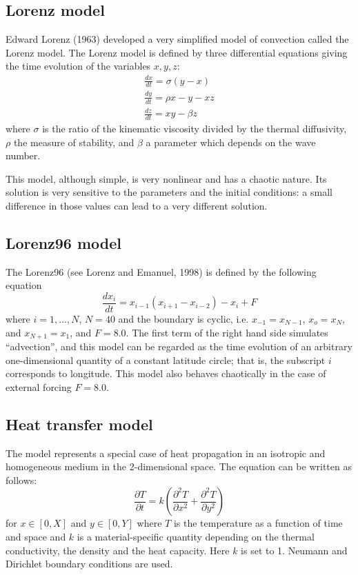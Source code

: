 \documentclass[a4paper,12pt]{article}
\begin{document}
     \subsection{Lorenz model}
     Edward Lorenz (1963) developed a very simplified model of convection called the Lorenz model. The Lorenz model is defined by three differential equations giving the time evolution of the variables $x,y,z$:
      \begin{eqnarray}
         \frac{dx}{dt}=\sigma(y-x) \\
         \frac{dy}{dt}=\rho x - y -x z \\
         \frac{dz}{dt}=x y - \beta z
      \end{eqnarray}
      where $\sigma$ is the ratio of the kinematic viscosity divided by the thermal diffusivity, $\rho$ the measure of stability, and $\beta$ a parameter which depends on the wave number.

      This model, although simple, is very nonlinear and has a chaotic nature.
      Its solution is very sensitive to the parameters and the initial
      conditions: a small difference in those values can lead to a very different solution.

      \subsection{Lorenz96 model} %
      The Lorenz96 (see Lorenz and Emanuel, 1998) is defined by the following equation
      \begin{equation}
         \frac{dx_i}{dt}=x_{i-1}(x_{i+1}-x_{i-2})-x_{i}+F
      \end{equation}
      where $i=1,...,N$, $N=40$ and the boundary is cyclic, i.e.
      $x_{-1}=x_{N-1}$, $x_{o}=x_{N}$, and $x_{N+1}=x_{1}$, and $F=8.0$. The
      first term of the right hand side simulates ``advection'', and this model
      can be regarded as the time evolution of an arbitrary one-dimensional
      quantity of a constant latitude circle; that is, the subscript $i$
      corresponds to longitude. This model also behaves chaotically in the case
      of external forcing $F=8.0$.

      \subsection{Heat transfer model} %
      The model represents a special case of heat propagation in an isotropic and homogeneous medium in the 2-dimensional space. The equation can be written as follows:
      \begin{equation}
         \frac{\partial T}{\partial t}=k(\frac{\partial^2 T}{\partial x^2}+\frac{\partial^2 T}{\partial y^2})
      \end{equation}
      for $x \in [0,X]$ and $y \in [0,Y]$ where $T$ is the temperature as a
      function of time and space and $k$ is a material-specific quantity
      depending on the thermal conductivity, the density and the heat capacity.
      Here $k$ is set to 1. Neumann and Dirichlet boundary conditions  are
      used.
\end{document}
